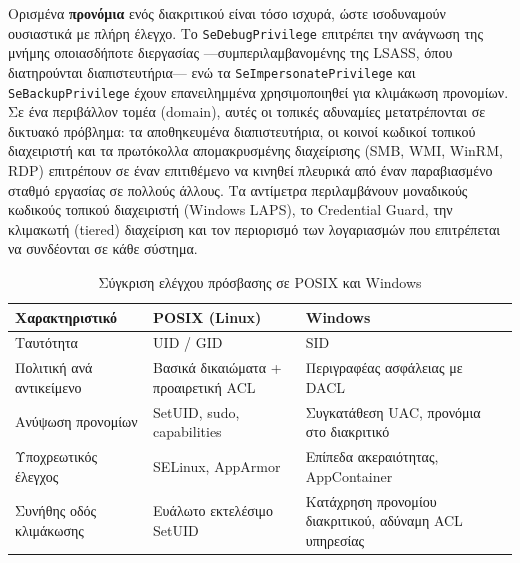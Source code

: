 Ορισμένα \textbf{προνόμια} ενός διακριτικού είναι τόσο ισχυρά, ώστε ισοδυναμούν ουσιαστικά με πλήρη έλεγχο. Το \texttt{SeDebugPrivilege} επιτρέπει την ανάγνωση της μνήμης οποιασδήποτε διεργασίας —συμπεριλαμβανομένης της LSASS, όπου διατηρούνται διαπιστευτήρια— ενώ τα \texttt{SeImpersonatePrivilege} και \texttt{SeBackupPrivilege} έχουν επανειλημμένα χρησιμοποιηθεί για κλιμάκωση προνομίων. Σε ένα περιβάλλον τομέα (domain), αυτές οι τοπικές αδυναμίες μετατρέπονται σε δικτυακό πρόβλημα: τα αποθηκευμένα διαπιστευτήρια, οι κοινοί κωδικοί τοπικού διαχειριστή και τα πρωτόκολλα απομακρυσμένης διαχείρισης (SMB, WMI, WinRM, RDP) επιτρέπουν σε έναν επιτιθέμενο να κινηθεί πλευρικά από έναν παραβιασμένο σταθμό εργασίας σε πολλούς άλλους. Τα αντίμετρα περιλαμβάνουν μοναδικούς κωδικούς τοπικού διαχειριστή (Windows LAPS), το Credential Guard, την κλιμακωτή (tiered) διαχείριση και τον περιορισμό των λογαριασμών που επιτρέπεται να συνδέονται σε κάθε σύστημα.

\begin{table}[htbp]
  \centering\small
  \caption{Σύγκριση ελέγχου πρόσβασης σε POSIX και Windows}
  \begin{tabularx}{\linewidth}{>{\raggedright\arraybackslash}X >{\raggedright\arraybackslash}X >{\raggedright\arraybackslash}X}
    \toprule
    \textbf{Χαρακτηριστικό} & \textbf{POSIX (Linux)} & \textbf{Windows} \\
    \midrule
    Ταυτότητα & UID / GID & SID \\
    Πολιτική ανά αντικείμενο & Βασικά δικαιώματα + προαιρετική ACL & Περιγραφέας ασφάλειας με DACL \\
    Ανύψωση προνομίων & SetUID, sudo, capabilities & Συγκατάθεση UAC, προνόμια στο διακριτικό \\
    Υποχρεωτικός έλεγχος & SELinux, AppArmor & Επίπεδα ακεραιότητας, AppContainer \\
    Συνήθης οδός κλιμάκωσης & Ευάλωτο εκτελέσιμο SetUID & Κατάχρηση προνομίου διακριτικού, αδύναμη ACL υπηρεσίας \\
    \bottomrule
  \end{tabularx}
\end{table}
